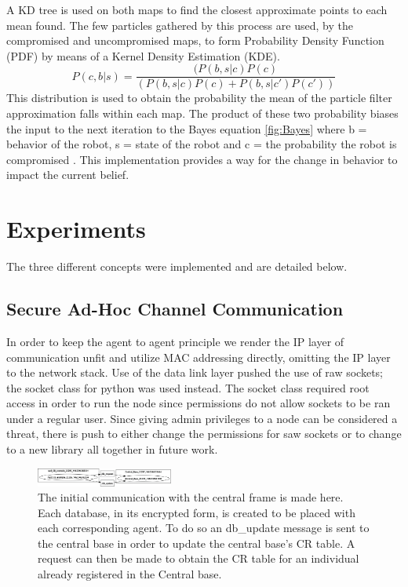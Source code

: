 \documentclass[conference]{IEEEtran}
\begin{document}
A KD tree is used on both maps to find the closest approximate points to each mean found. The few particles gathered by this process are used, by the compromised and uncompromised maps, to form Probability Density Function (PDF) by means of a Kernel Density Estimation (KDE). 
\begin{equation}
 P(c,b|s) =\frac {(P(b,s|c)P(c)} {(P(b,s|c)P(c) + 
 P(b,s|c' )P(c' ))} 
 \label{fig:Bayes}
\end{equation}
This distribution is used to obtain the probability the mean of the particle filter approximation falls within each map. The product of these two probability biases the input to the next iteration to the Bayes equation \autoref{fig:Bayes} where b = behavior of the robot, s = state of the robot and c = the probability the robot is compromised \cite{Thrun2002Probabilistic}. This implementation provides a way for the change in behavior to impact the current belief.


\section{Experiments} \label{Experiments}

The three different concepts were implemented and are detailed below.

\subsection{Secure Ad-Hoc Channel Communication}

In order to keep the agent to agent principle we render the IP layer of communication unfit and utilize MAC addressing directly, omitting the IP layer to the network stack. Use of the data link layer pushed the use of raw sockets; the socket class for python was used instead. The socket class required root access in order to run the node since permissions do not allow sockets to be ran under a regular user. Since giving admin privileges to a node can be considered a threat, there is push to either change the permissions for saw sockets or to change to a new library all together in future work.

\begin{figure}[h]
\centering
\includegraphics[width=0.4\textwidth]{TopicIntr1}
\caption{The initial communication with the central frame is made here. Each database, in its encrypted form, is created to be placed with each corresponding agent. To do so an db\_update message is sent to the central base in order to update the central base's CR table. A request can then be made to obtain the CR table for an individual already registered in the Central base.}
\label{fig:TopicIntr1}
\end{figure}
\end{document}
